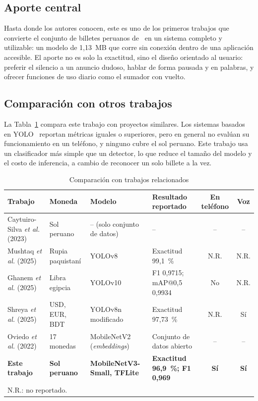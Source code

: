 \documentclass[conference,a4paper]{IEEEtran}
\begin{document}
\subsection{Aporte central}

Hasta donde los autores conocen, este es uno de los primeros trabajos que convierte el conjunto de billetes peruanos de~\cite{caytuiro2023} en un sistema completo y utilizable: un modelo de 1,13~MB que corre sin conexión dentro de una aplicación accesible. El aporte no es solo la exactitud, sino el diseño orientado al usuario: preferir el silencio a un anuncio dudoso, hablar de forma pausada y en palabras, y ofrecer funciones de uso diario como el sumador con vuelto.

\subsection{Comparación con otros trabajos}

La Tabla~\ref{tab:comp} compara este trabajo con proyectos similares. Los sistemas basados en YOLO~\cite{mushtaq2025,ghanem2025,shreya2025} reportan métricas iguales o superiores, pero en general no evalúan su funcionamiento en un teléfono, y ninguno cubre el sol peruano. Este trabajo usa un clasificador más simple que un detector, lo que reduce el tamaño del modelo y el costo de inferencia, a cambio de reconocer un solo billete a la vez.

\begin{table}[!t]
\caption{Comparación con trabajos relacionados}
\label{tab:comp}
\centering
\footnotesize
\begin{tabular}{|l|l|l|l|c|c|}
\hline
\textbf{Trabajo} & \textbf{Moneda} & \textbf{Modelo} & \textbf{Resultado reportado} & \textbf{En teléfono} & \textbf{Voz} \\
\hline
Caytuiro-Silva \emph{et al.} (2023)~\cite{caytuiro2023} & Sol peruano & -- (solo conjunto de datos) & -- & -- & -- \\
Mushtaq \emph{et al.} (2025)~\cite{mushtaq2025} & Rupia paquistaní & YOLOv8 & Exactitud 99,1~\% & N.R. & N.R. \\
Ghanem \emph{et al.} (2025)~\cite{ghanem2025} & Libra egipcia & YOLOv10 & F1 0,9715; mAP@0,5 0,9934 & No & N.R. \\
Shreya \emph{et al.} (2025)~\cite{shreya2025} & USD, EUR, BDT & YOLOv8n modificado & Exactitud 97,73~\% & N.R. & Sí \\
Oviedo \emph{et al.} (2022)~\cite{oviedo2022} & 17 monedas & MobileNetV2 (\emph{embeddings}) & Conjunto de datos abierto & -- & -- \\
\textbf{Este trabajo} & \textbf{Sol peruano} & \textbf{MobileNetV3-Small, TFLite} & \textbf{Exactitud 96,9~\%; F1 0,969} & \textbf{Sí} & \textbf{Sí} \\
\hline
\multicolumn{6}{l}{\scriptsize N.R.: no reportado.} \\
\end{tabular}
\end{table}
\end{document}
